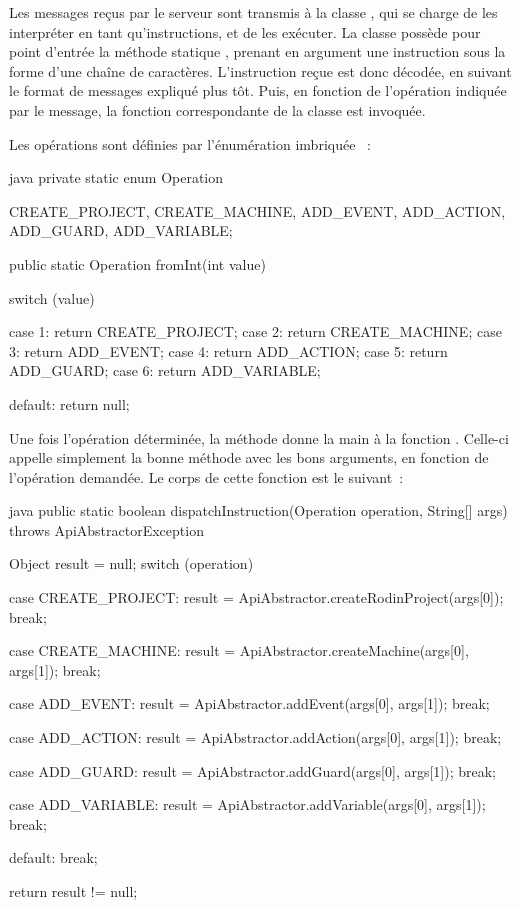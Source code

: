 Les messages reçus par le serveur sont transmis à la classe , qui se charge de les interpréter en tant qu'instructions, et de les exécuter.
La classe  possède pour point d'entrée la méthode statique , prenant en argument une instruction sous la forme d'une chaîne de caractères.
L'instruction reçue est donc décodée, en suivant le format de messages expliqué plus tôt.
Puis, en fonction de l'opération indiquée par le message, la fonction correspondante de la classe  est invoquée.

Les opérations sont définies par l'énumération imbriquée ~:

\begin{imtaCode}{java}
private static enum Operation {
    CREATE_PROJECT,
    CREATE_MACHINE,
    ADD_EVENT,
    ADD_ACTION,
    ADD_GUARD,
    ADD_VARIABLE;

    public static Operation fromInt(int value) {
        switch (value) {
            case 1:
                return CREATE_PROJECT;
            case 2:
                return CREATE_MACHINE;
            case 3:
                return ADD_EVENT;
            case 4:
                return ADD_ACTION;
            case 5:
                return ADD_GUARD;
            case 6:
                return ADD_VARIABLE;

            default:
                return null;
        }
    }
}
\end{imtaCode}

Une fois l'opération déterminée, la méthode  donne la main à la fonction .
Celle-ci appelle simplement la bonne méthode avec les bons arguments, en fonction de l'opération demandée.
Le corps de cette fonction est le suivant~:

\begin{imtaCode}{java}
public static boolean dispatchInstruction(Operation operation, String[] args) throws ApiAbstractorException {
    Object result = null;
    switch (operation) {
        case CREATE_PROJECT:
            result = ApiAbstractor.createRodinProject(args[0]);
            break;
                
        case CREATE_MACHINE:
            result = ApiAbstractor.createMachine(args[0], args[1]);
            break;
                
        case ADD_EVENT:
            result = ApiAbstractor.addEvent(args[0], args[1]);
            break;
                
        case ADD_ACTION:
            result = ApiAbstractor.addAction(args[0], args[1]);
            break;
                
        case ADD_GUARD:
            result = ApiAbstractor.addGuard(args[0], args[1]);
            break;
                
        case ADD_VARIABLE:
            result = ApiAbstractor.addVariable(args[0], args[1]);
            break;
                
        default:
            break;
    }
    
    return result != null;
}
\end{imtaCode}


